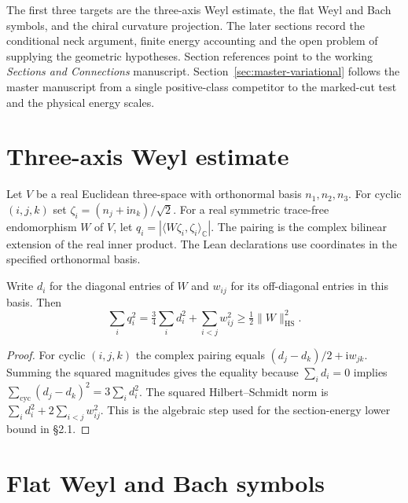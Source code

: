 The first three targets are the three-axis Weyl estimate, the flat Weyl and
Bach symbols, and the chiral curvature projection. The later sections record
the conditional neck argument, finite energy accounting and the open problem of
supplying the geometric hypotheses. Section references point to the working
\emph{Sections and Connections} manuscript. Section~\ref{sec:master-variational}
follows the master manuscript from a single positive-class competitor to
the marked-cut test and the physical energy scales.

\section{Three-axis Weyl estimate}

\begin{definition}
\label{def:null-evaluations}
\leanok
Let $V$ be a real Euclidean three-space with orthonormal basis
$n_1,n_2,n_3$. For cyclic $(i,j,k)$ set
$\zeta_i=(n_j+\mathrm{i}n_k)/\sqrt{2}$. For a real symmetric
trace-free endomorphism $W$ of $V$, let
$q_i=|\langle W\zeta_i,\zeta_i\rangle_{\mathbb C}|$.
The pairing is the complex bilinear extension of the real inner product.
The Lean declarations use coordinates in the specified orthonormal basis.
\end{definition}

\begin{lemma}
\label{lem:three-axis-weyl}
\leanok
Write $d_i$ for the diagonal entries of $W$ and $w_{ij}$ for its
off-diagonal entries in this basis. Then
\[
  \sum_i q_i^2
    =\tfrac34\sum_i d_i^2+\sum_{i<j}w_{ij}^2
    \ge \tfrac12\lVert W\rVert_{\mathrm{HS}}^2 .
\]
\end{lemma}

\begin{proof}
\leanok
For cyclic $(i,j,k)$ the complex pairing equals
$(d_j-d_k)/2+\mathrm{i}w_{jk}$. Summing the squared magnitudes gives
the equality because $\sum_i d_i=0$ implies
$\sum_{\mathrm{cyc}}(d_j-d_k)^2=3\sum_i d_i^2$.
The squared Hilbert--Schmidt norm is
$\sum_i d_i^2+2\sum_{i<j}w_{ij}^2$. This is the algebraic step used
for the section-energy lower bound in \S2.1.
\end{proof}

\section{Flat Weyl and Bach symbols}

